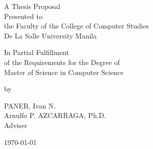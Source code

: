 %
%
%                 

\begin{titlepage}
\centering



\vspace{1.75cm}
A Thesis Proposal\\
Presented to\\
the Faculty of the College of Computer Studies\\
De La Salle University Manila

\vspace{1.75cm}
In Partial Fulfillment\\
of the Requirements for the Degree of\\
Master of Science in Computer Science

\vspace{1.75cm}
by\\
\vspace{1cm}

PANER, Ivan N.  \\


\vspace{1.75cm}
Arnulfo P. AZCARRAGA, Ph.D. \\
Adviser

\vspace{1.75cm}
\today
\end{titlepage}
